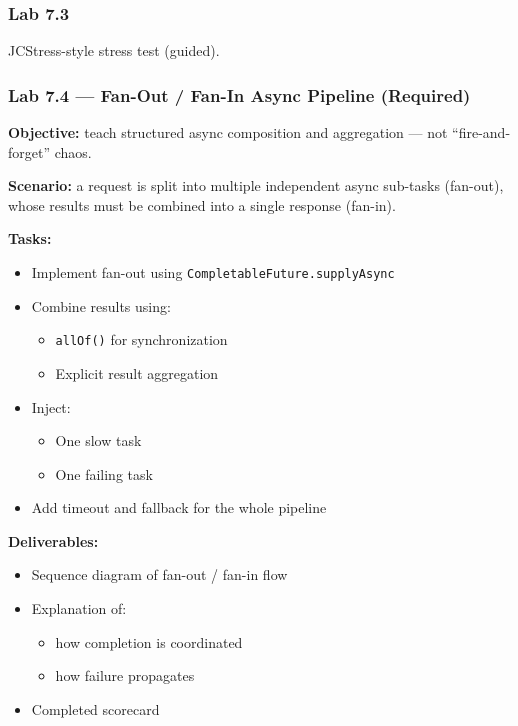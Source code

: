\documentclass[11pt,a4paper]{article}
\begin{document}
	\subsubsection*{Lab 7.3}
	JCStress-style stress test (guided).
	
	\subsubsection*{Lab 7.4 --- Fan-Out / Fan-In Async Pipeline (Required)}
	
	\textbf{Objective:} teach structured async composition and aggregation --- not ``fire-and-forget'' chaos.
	
	\textbf{Scenario:} a request is split into multiple independent async sub-tasks (fan-out), whose results must be combined into a single response (fan-in).
	
	\textbf{Tasks:}
	\begin{itemize}[leftmargin=*]
		\item Implement fan-out using \texttt{CompletableFuture.supplyAsync}
		\item Combine results using:
		\begin{itemize}[leftmargin=*]
			\item \texttt{allOf()} for synchronization
			\item Explicit result aggregation
		\end{itemize}
		\item Inject:
		\begin{itemize}[leftmargin=*]
			\item One slow task
			\item One failing task
		\end{itemize}
		\item Add timeout and fallback for the whole pipeline
	\end{itemize}
	
	\textbf{Deliverables:}
	\begin{itemize}[leftmargin=*]
		\item Sequence diagram of fan-out / fan-in flow
		\item Explanation of:
		\begin{itemize}[leftmargin=*]
			\item how completion is coordinated
			\item how failure propagates
		\end{itemize}
		\item Completed scorecard
	\end{itemize}
	
\end{document}
